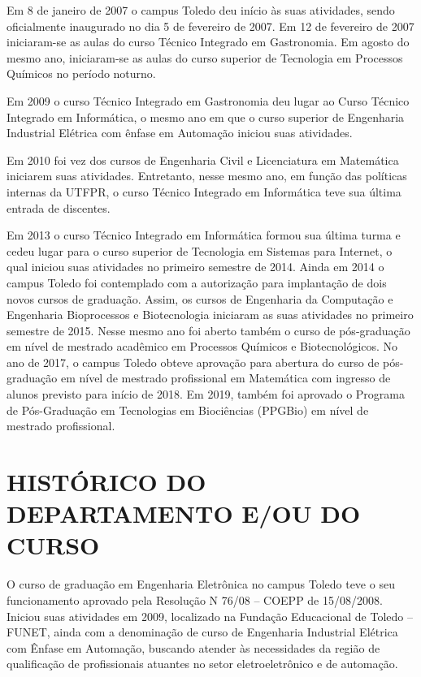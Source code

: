 Em 8 de janeiro de 2007 o campus Toledo deu início às suas atividades, sendo oficialmente inaugurado no dia 5 de fevereiro de 2007. Em 12 de fevereiro de 2007 iniciaram-se as aulas do curso Técnico Integrado em Gastronomia. Em agosto do mesmo ano, iniciaram-se as aulas do curso superior de Tecnologia em Processos Químicos no período noturno.

Em 2009 o curso Técnico Integrado em Gastronomia deu lugar ao Curso Técnico Integrado em Informática, o mesmo ano em que o curso superior de Engenharia Industrial Elétrica com ênfase em Automação iniciou suas atividades.

Em 2010 foi vez dos cursos de Engenharia Civil e Licenciatura em Matemática iniciarem suas atividades. Entretanto, nesse mesmo ano, em função das políticas internas da UTFPR, o curso Técnico Integrado em Informática teve sua última entrada de discentes.

Em 2013 o curso Técnico Integrado em Informática formou sua última turma e cedeu lugar para o curso superior de Tecnologia em Sistemas para Internet, o qual iniciou suas atividades no primeiro semestre de 2014. Ainda em 2014 o campus Toledo foi contemplado com a autorização para implantação de dois novos cursos de graduação. Assim, os cursos de Engenharia da Computação e Engenharia Bioprocessos e Biotecnologia iniciaram as suas atividades no primeiro semestre de 2015. Nesse mesmo ano foi aberto também o curso de pós-graduação em nível de mestrado acadêmico em Processos Químicos e Biotecnológicos. No ano de 2017, o campus Toledo obteve aprovação para abertura do curso de pós-graduação em nível de mestrado profissional em Matemática com ingresso de alunos previsto para início de 2018. Em 2019, também foi aprovado o Programa de Pós-Graduação em Tecnologias em Biociências (PPGBio) em nível de mestrado profissional.


\section{HISTÓRICO DO DEPARTAMENTO E/OU DO CURSO}

O curso de graduação em Engenharia Eletrônica no campus Toledo teve o seu funcionamento aprovado pela Resolução N\textordmasculine{} 76/08 – COEPP de 15/08/2008. Iniciou suas atividades em 2009, localizado na Fundação Educacional de Toledo – FUNET, ainda com a denominação de curso de Engenharia Industrial Elétrica com Ênfase em Automação, buscando atender às necessidades da região de qualificação de profissionais atuantes no setor eletroeletrônico e de automação.

